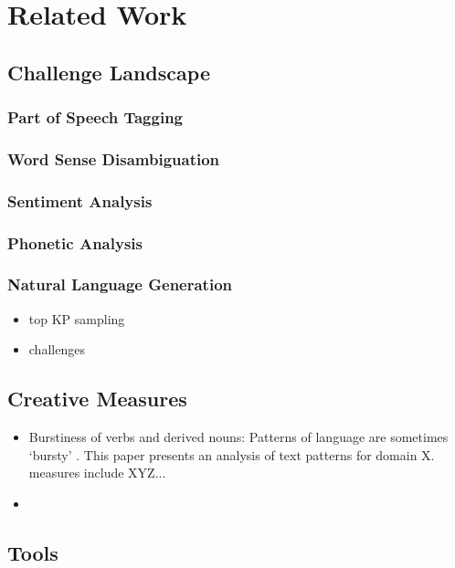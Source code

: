 \chapter{Related Work}

\section{Challenge Landscape}

\subsection{Part of Speech Tagging}

\subsection{Word Sense Disambiguation}

\subsection{Sentiment Analysis}

\subsection{Phonetic Analysis}

\subsection{Natural Language Generation}
\begin{itemize}
    \item top KP sampling
    \item challenges 
\end{itemize}


\section{Creative Measures}
\begin{itemize}
    \item Burstiness of verbs and derived nouns: Patterns of language are sometimes `bursty' \cite{pierrehumbert_burstiness_2012}. This paper presents an analysis of text patterns for domain X. measures include XYZ...
    \item 
\end{itemize}

\section{Tools}

